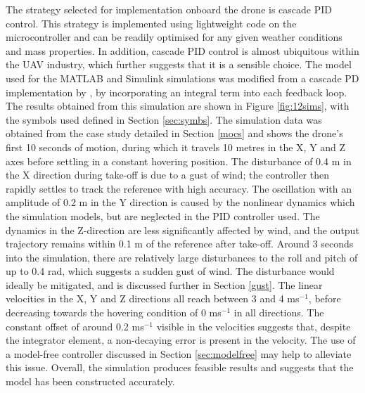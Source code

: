 The strategy selected for implementation onboard the drone is cascade \gls{PID} control. This strategy is implemented using lightweight code on the microcontroller and can be readily optimised for any given weather conditions and mass properties. In addition, cascade \gls{PID} control is almost ubiquitous within the \gls{UAV} industry, which further suggests that it is a sensible choice. The model used for the MATLAB and Simulink simulations was modified from a cascade \gls{PD} implementation by \cite{nekoo}, by incorporating an integral term into each feedback loop. The results obtained from this simulation are shown in Figure \ref{fig:12sims}, with the symbols used defined in Section \ref{sec:symbs}. The simulation data was obtained from the case study detailed in Section \ref{mocs} and shows the drone's first 10 seconds of motion, during which it travels 10 metres in the X, Y and Z axes before settling in a constant hovering position. The disturbance of 0.4 m in the X direction during take-off is due to a gust of wind; the controller then rapidly settles to track the reference with high accuracy. The oscillation with an amplitude of 0.2 m in the Y direction is caused by the nonlinear dynamics which the simulation models, but are neglected in the \gls{PID} controller used. The dynamics in the Z-direction are less significantly affected by wind, and the output trajectory remains within 0.1 m of the reference after take-off. Around 3 seconds into the simulation, there are relatively large disturbances to the roll and pitch of up to 0.4 rad, which suggests a sudden gust of wind. The disturbance would ideally be mitigated, and is discussed further in Section \ref{gust}. The linear velocities in the X, Y and Z directions all reach between 3 and 4 ms${^{-1}}$, before decreasing towards the hovering condition of 0 ms${^{-1}}$ in all directions. The constant offset of around 0.2 ms${^{-1}}$ visible in the velocities suggests that, despite the integrator element, a non-decaying error is present in the velocity. The use of a model-free controller discussed in Section \ref{sec:modelfree} may help to alleviate this issue. Overall, the simulation produces feasible results and suggests that the model has been constructed accurately.



